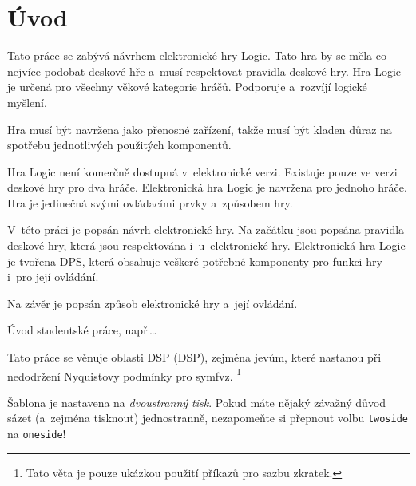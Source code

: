 \chapter*{Úvod}
{}

Tato práce se zabývá návrhem elektronické hry Logic. Tato hra by se měla co nejvíce podobat deskové hře a~musí respektovat pravidla deskové 
hry. Hra Logic je určená pro všechny věkové kategorie hráčů. Podporuje a~rozvíjí logické myšlení. 

Hra musí být navržena jako přenosné zařízení, takže musí být kladen důraz na spotřebu jednotlivých použitých komponentů.

Hra Logic není komerčně dostupná v~elektronické verzi. Existuje pouze ve verzi deskové hry pro dva hráče. Elektronická hra Logic je 
navržena pro jednoho hráče. Hra je jedinečná svými ovládacími prvky a~způsobem hry. 

V~této práci je popsán návrh elektronické hry. Na začátku jsou popsána pravidla deskové hry, která jsou respektována i~u~elektronické hry. 
Elektronická hra Logic je tvořena DPS, která obsahuje veškeré potřebné komponenty pro funkci hry i~pro její ovládání.

Na závěr je popsán způsob elektronické hry a~její ovládání.


Úvod studentské práce, např\,\dots

Tato práce se věnuje oblasti \acs{DSP} (\acl{DSP}), zejména jevům, které nastanou při nedodržení Nyquistovy podmínky pro \ac{symfvz}.%
\footnote{Tato věta je pouze ukázkou použití příkazů pro sazbu zkratek.}

Šablona je nastavena na \emph{dvoustranný tisk}. Pokud máte nějaký závažný důvod sázet (a~zejména tisknout) jednostranně, nezapomeňte si přepnout volbu \texttt{twoside} na \texttt{oneside}!